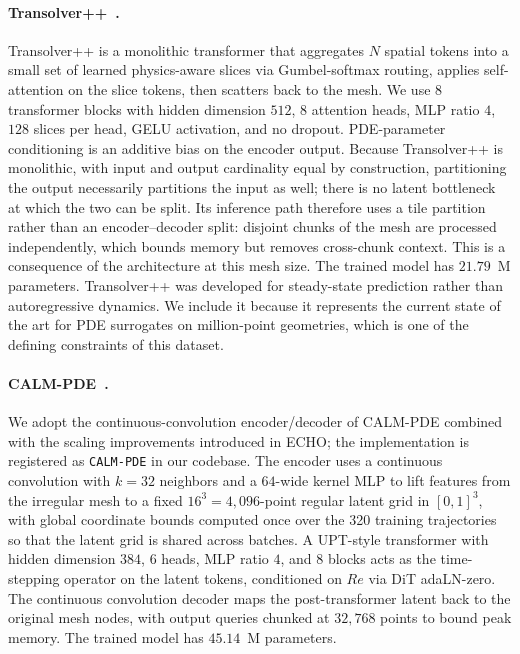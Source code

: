 \documentclass{article}
\begin{document}
\paragraph{Transolver++~\citep{luotransolverplus}.} Transolver++ is a monolithic transformer that aggregates $N$ spatial tokens into a small set of learned physics-aware slices via Gumbel-softmax routing, applies self-attention on the slice tokens, then scatters back to the mesh. We use $8$ transformer blocks with hidden dimension $512$, $8$ attention heads, MLP ratio $4$, $128$ slices per head, GELU activation, and no dropout. PDE-parameter conditioning is an additive bias on the encoder output. \textcolor{revcolor}{Because Transolver++ is monolithic, with input and output cardinality equal by construction, partitioning the output necessarily partitions the input as well; there is no latent bottleneck at which the two can be split. Its inference path therefore uses a tile partition rather than an encoder--decoder split: disjoint chunks of the mesh are processed independently, which bounds memory but removes cross-chunk context. This is a consequence of the architecture at this mesh size.} The trained model has $21.79$~M parameters. \textcolor{revcolor}{Transolver++ was developed for steady-state prediction rather than autoregressive dynamics. We include it because it represents the current state of the art for PDE surrogates on million-point geometries, which is one of the defining constraints of this dataset.}

\paragraph{CALM-PDE~\citep{calmpde,koupai2025efficientgenerativetransformeroperators}.} We adopt the continuous-convolution encoder/decoder of CALM-PDE combined with the scaling improvements introduced in ECHO; the implementation is registered as \texttt{CALM-PDE} in our codebase. The encoder uses a continuous convolution with $k{=}32$ neighbors and a $64$-wide kernel MLP to lift features from the irregular mesh to a fixed $16^3 = 4{,}096$-point regular latent grid in $[0,1]^3$, with global coordinate bounds computed once over the \textcolor{revcolor}{320 training trajectories} so that the latent grid is shared across batches. A UPT-style transformer with hidden dimension $384$, $6$ heads, MLP ratio $4$, and $8$ blocks acts as the time-stepping operator on the latent tokens, conditioned on $Re$ via DiT adaLN-zero. The continuous convolution decoder maps the post-transformer latent back to the original mesh nodes, with output queries chunked at $32{,}768$ points to bound peak memory. The trained model has $45.14$~M parameters.
\end{document}
